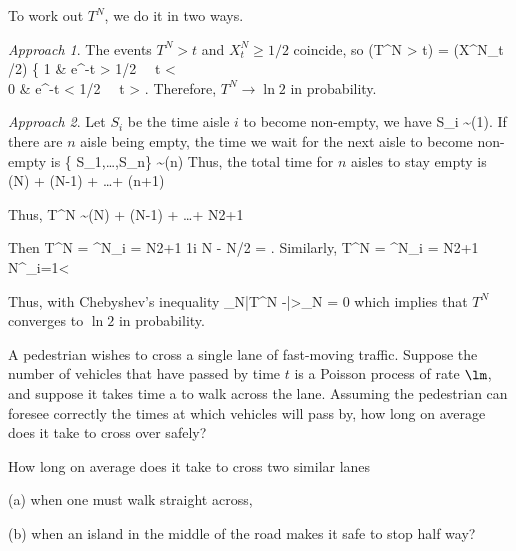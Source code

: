 To work out $T^N$, we do it in two ways.

\emph{Approach 1}. The events $T^N > t$ and $X^N_t \geq 1/2$ coincide, so
\be
\pro(T^N > t) = \pro(X^N_t /2) \to \left\{
1 \quad \quad & e^{-t} > 1/2 \ \ra \ t < \\
0 & e^{-t} < 1/2 \ \ra \ t > 
\ea\right.
\ee
Therefore, $T^N\to \ln 2$ in probability.

\emph{Approach 2}. Let $S_i$ be the time aisle $i$ to become non-empty, we have
\be
S_i \sim \sE(1).
\ee
If there are $n$ aisle being empty, the time we wait for the next aisle to become non-empty is
\be
\min\{ S_1,\dots,S_n\} \sim \sE(n)
\ee
Thus, the total time for $n$ aisles to stay empty is 
\be
\sE(N) + \sE(N-1) + \dots + \sE(n+1)
\ee

Thus,
\be
T^N \sim \sE(N) + \sE(N-1) + \dots + \sE\lob\left\lfloor\frac N2\right\rfloor+1\rob
\ee

Then
\be
\E T^N = \sum^{N}_{i = \left\lfloor\frac N2\right\rfloor+1} \frac 1i \approx \log N - \log N/2 = .
\ee
Similarly,
\be
\var T^N = \sum^{N}_{i = \left\lfloor\frac N2\right\rfloor+1}   \quad {}N\to \infty \quad \lob {}\sum^\infty_{i=1}<\infty \rob 
\ee

Thus, with Chebyshev's inequality 
\be
\lim_{N\to\infty}\pro\lob|T^N -|>\ve\rob \leq \lim_{N\to\infty}  = 0
\ee
which implies that $T^N$ converges to $\ln 2$ in probability.

\vspace{2mm}

\qcutline


\begin{exercise}
A pedestrian wishes to cross a single lane of fast-moving traffic. Suppose the number of vehicles that have passed by time $t$ is a Poisson process of rate $\lm$, and suppose it takes time a to walk across the lane. Assuming the pedestrian can foresee correctly the times at which vehicles will pass by, how long on average does it take to cross over safely? 

How long on average does it take to cross two similar lanes 
\ben\item [(a)] when one must walk straight across,
\item [(b)] when an island in the middle of the road makes it safe to stop half way?
\een
\end{exercise}


